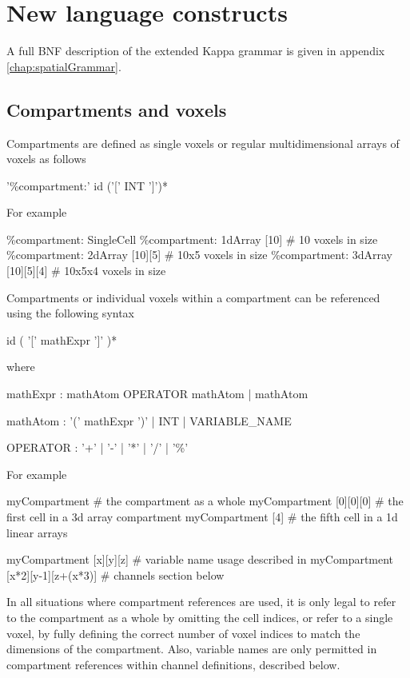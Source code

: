 \section{New language constructs}

A full BNF description of the extended Kappa grammar is given in appendix \ref{chap:spatialGrammar}.

\subsection{Compartments and voxels}

Compartments are defined as single voxels or regular multidimensional arrays of voxels as follows
\begin{bnfsource}
'\%compartment:' id ('[' INT ']')*
\end{bnfsource}
For example
\begin{kappasource}
\%compartment: SingleCell 
\%compartment: 1dArray [10]       # 10 voxels in size 
\%compartment: 2dArray [10][5]    # 10x5 voxels in size 
\%compartment: 3dArray [10][5][4] # 10x5x4 voxels in size 
\end{kappasource}

Compartments or individual voxels within a compartment can be referenced using the following syntax
\begin{bnfsource}
id ( '[' mathExpr ']' )*
\end{bnfsource}
where
\begin{bnfsource}
mathExpr :
  mathAtom OPERATOR mathAtom
  | mathAtom
  
mathAtom :
  '(' mathExpr ')'
  | INT
  | VARIABLE_NAME
  
OPERATOR :
  '+' | '-' | '*' | '/' | '\%'
\end{bnfsource}
For example
\begin{kappasource}
myCompartment                     # the compartment as a whole
myCompartment [0][0][0]           # the first cell in a 3d array compartment
myCompartment [4]                 # the fifth cell in a 1d linear arrays

myCompartment [x][y][z]           # variable name usage described in
myCompartment [x*2][y-1][z+(x*3)] #   channels section below
\end{kappasource}

In all situations where compartment references are used, it is only legal to refer to the compartment as a whole by omitting the cell indices, or refer to a single voxel, by fully defining the correct number of voxel indices to match the dimensions of the compartment. Also, variable names are only permitted in compartment references within channel definitions, described below.

